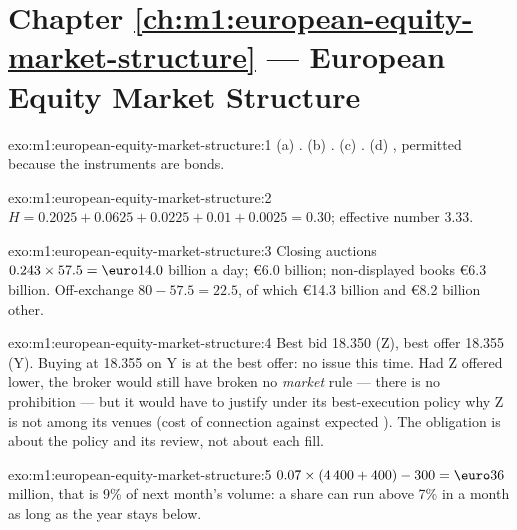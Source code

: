 \section*{Chapter \ref{ch:m1:european-equity-market-structure} --- European Equity Market Structure}

\begin{solution}{exo:m1:european-equity-market-structure:1}
(a) . (b) . (c) . (d) , permitted because the
instruments are bonds.
\end{solution}

\begin{solution}{exo:m1:european-equity-market-structure:2}
$H = 0.2025 + 0.0625 + 0.0225 + 0.01 + 0.0025 = 0.30$; effective number
3.33.
\end{solution}

\begin{solution}{exo:m1:european-equity-market-structure:3}
Closing auctions $0.243 \times 57.5 = \text{\euro}14.0$ billion a day;
 \euro 6.0 billion; non-displayed books \euro 6.3 billion.
Off-exchange $80 - 57.5 = 22.5$, of which \euro 14.3 billion  and \euro 8.2 billion other.
\end{solution}

\begin{solution}{exo:m1:european-equity-market-structure:4}
Best bid 18.350 (Z), best offer 18.355 (Y). Buying at 18.355 on Y is at the
best offer: no issue this time. Had Z offered lower, the broker would still
have broken no \emph{market} rule --- there is no  prohibition
--- but it would have to justify under its best-execution policy why Z is
not among its venues (cost of connection against expected ). The obligation is about the policy and its review, not about
each fill.
\end{solution}

\begin{solution}{exo:m1:european-equity-market-structure:5}
$0.07 \times (4\,400 + 400) - 300 = \text{\euro}36$ million, that is 9\% of
next month's volume: a share can run above 7\% in a month as long as the year
stays below.
\end{solution}

